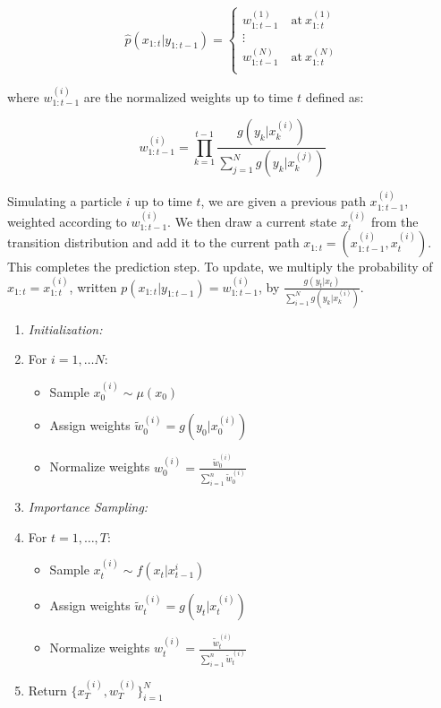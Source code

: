 \documentclass{article}
\begin{document}
\begin{equation}
\widehat{p}(x_{1:t}|y_{1:t-1}) = \begin{cases}
w_{1:t-1}^{(1)} \quad \text{at} \ x_{1:t}^{(1)} \\
\vdots \\
w_{1:t-1}^{(N)} \quad \text{at} \ x_{1:t}^{(N)} \\
\end{cases}
\end{equation}

\noindent
where $w_{1:t-1}^{(i)}$ are the normalized weights up to time $t$ defined as:

\begin{equation}
w_{1:t-1}^{(i)} = \prod_{k=1}^{t-1} \frac{g(y_k|x_k^{(i)})}{\sum_{j=1}^N g(y_k|x_k^{(j)})}
\end{equation}

Simulating a particle $i$ up to time $t$, we are given a previous path $x_{1:t-1}^{(i)}$, weighted according to $w_{1:t-1}^{(i)}$. We then draw a current state $x_{t}^{(i)}$ from the transition distribution and add it to the current path $x_{1:t} = (x_{1:t-1}^{(i)},x_t^{(i)})$. This completes the prediction step. To update, we multiply the probability of $x_{1:t} = x_{1:t}^{(i)}$, written $p(x_{1:t}|y_{1:t-1}) = w_{1:t-1}^{(i)}$, by $\frac{g(y_t|x_t)}{\sum_{i=1}^N g(y_k|x_k^{(i)})}$.

\begin{enumerate}
\item \textit{Initialization:}
\item[] For $i=1,\dots N$:
\begin{itemize}
\item[] Sample $x_0^{(i)} \sim \mu(x_0)$
\item[] Assign weights $\widetilde{w}_0^{(i)} = g(y_0|x_0^{(i)})$
\item[] Normalize weights $w_0^{(i)} = \frac{\widetilde{w}_0^{(i)}}{\sum_{i=1}^{n} \widetilde{w}_0^{(i)}}$
\end{itemize}
\item \textit{Importance Sampling:}
\item[] For $t=1,\dots,T$:
\begin{itemize}
\item[] Sample $x_t^{(i)} \sim f(x_t|x_{t-1}^{i})$
\item[] Assign weights $\widetilde{w}_t^{(i)} = g(y_t|x_t^{(i)})$
\item[] Normalize weights $w_t^{(i)} = \frac{\widetilde{w}_t^{(i)}}{\sum_{i=1}^{n} \widetilde{w}_t^{(i)}}$
\end{itemize}
\item Return $\{x_T^{(i)},w_T^{(i)}\}_{i=1}^N$
\end{enumerate}
\end{document}
